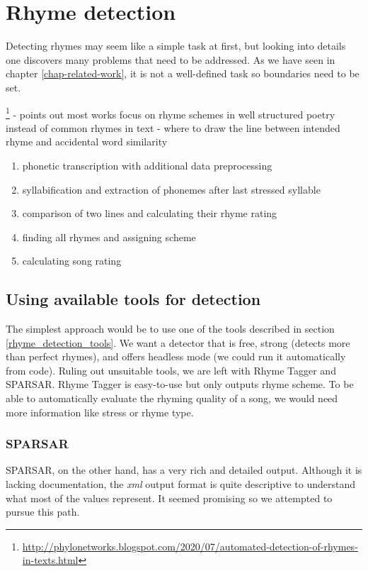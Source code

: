 
\chapter{Rhyme detection}
Detecting rhymes may seem like a simple task at first, but looking into details one discovers many problems that need to be addressed. As we have seen in chapter \ref{chap-related-work}, it is not a well-defined task so boundaries need to be set.


\footnote{\url{http://phylonetworks.blogspot.com/2020/07/automated-detection-of-rhymes-in-texts.html}}
- points out most works focus on rhyme schemes in well structured poetry instead of common rhymes in text
- where to draw the line between intended rhyme and accidental word similarity

\begin{enumerate}
	\item phonetic transcription with additional data preprocessing	
	\item syllabification and extraction of phonemes after last stressed syllable
	\item comparison of two lines and calculating their rhyme rating  
	\item finding all rhymes and assigning scheme
	\item calculating song rating
\end{enumerate}

\section{Using available tools for detection}
The simplest approach would be to use one of the tools described in section \ref{rhyme_detection_tools}. We want a detector that is free, strong (detects more than perfect rhymes), and offers headless mode (we could run it automatically from code). Ruling out unsuitable tools, we are left with Rhyme Tagger and SPARSAR. Rhyme Tagger is easy-to-use but only outputs rhyme scheme. To be able to automatically evaluate the rhyming quality of a song, we would need more information like stress or rhyme type.

\subsection*{SPARSAR}
SPARSAR, on the other hand, has a very rich and detailed output. Although it is lacking documentation, the \textit{xml} output format is quite descriptive to understand what most of the values represent. It seemed promising so we attempted to pursue this path.

